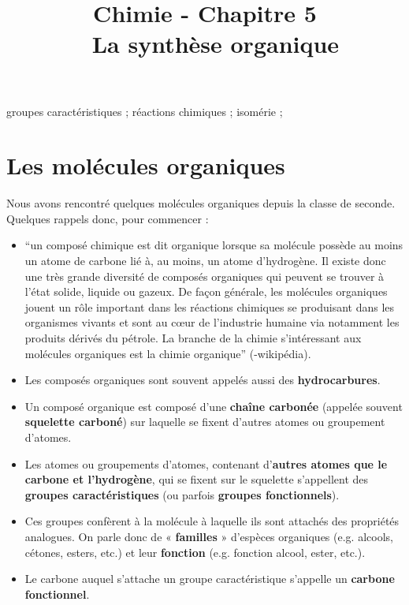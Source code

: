 \documentclass[11pt,a4paper]{article}
\title{\large Chimie - Chapitre 5 \\ \LARGE  La synthèse organique}
\date{}
\author{}
\begin{document}
\vspace{-1cm}
\maketitle
\vspace{-1cm}
\begin{tcolorbox}[title=Notions de la classe de première à rappeler]
groupes caractéristiques ; réactions chimiques ; isomérie ; 
\end{tcolorbox}
\tableofcontents

\section{Les molécules organiques}
Nous avons rencontré quelques molécules organiques depuis la classe de seconde. Quelques rappels donc, pour commencer : 

\begin{defn}{}
\begin{itemize}
    \item ``un composé chimique est dit organique lorsque sa molécule possède au moins un atome de carbone lié à, au moins, un atome d'hydrogène. Il existe donc une très grande diversité de composés organiques qui peuvent se trouver à l'état solide, liquide ou gazeux. De façon générale, les molécules organiques jouent un rôle important dans les réactions chimiques se produisant dans les organismes vivants et sont au cœur de l'industrie humaine via notamment les produits dérivés du pétrole. La branche de la chimie s'intéressant aux molécules organiques est la chimie organique'' (-wikipédia).
    \item Les composés organiques sont souvent appelés aussi des \textbf{hydrocarbures}.
    \item Un composé organique est composé d’une \textbf{chaîne carbonée} (appelée souvent \textbf{squelette carboné}) sur laquelle se fixent d’autres atomes ou groupement d’atomes.
    \item Les atomes ou groupements d’atomes, contenant d'\textbf{autres atomes que le carbone et l'hydrogène}, qui se fixent sur le squelette s’appellent des \textbf{groupes caractéristiques} (ou parfois \textbf{groupes fonctionnels}).
    \item Ces groupes confèrent à la molécule à laquelle ils sont attachés des propriétés analogues. On parle donc de « \textbf{familles} » d’espèces organiques (e.g. alcools, cétones, esters, etc.) et leur \textbf{fonction} (e.g. fonction alcool, ester, etc.).
    \item Le carbone auquel s'attache un groupe caractéristique s'appelle un \textbf{carbone fonctionnel}. 
\end{itemize}
\end{defn}
\end{document}
